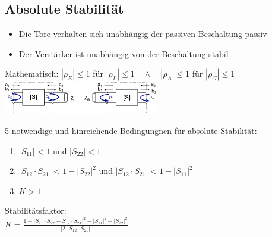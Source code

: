 \documentclass[english]{latex4ei/latex4ei_sheet}
\begin{document}
\begin{sectionbox}
	\subsection{Absolute Stabilität}
	\begin{itemize}
		\item Die Tore verhalten sich unabhängig der passiven Beschaltung passiv
		\item Der Verstärker ist unabhängig von der Beschaltung stabil
	\end{itemize}
	Mathematisch: $\left|\rho_{E}\right|\le1$ für $\left|\rho_{L}\right|\le1 \quad \wedge \quad\left|\rho_{A}\right|\le1$ für $\left|\rho_{G}\right|\le1$\\
	\includegraphics[width = 6.8cm]{./img/stablilitaet.png}\\
	\begin{emphbox}
		5 notwendige und hinreichende Bedingungnen für absolute Stabilität:\\
		\begin{enumerate}
			\item $\left|S_{11}\right|<1$ und $\left|S_{22}\right|<1$
			\item $\left|S_{12} \cdot S_{21}\right|<1-\left|S_{22}\right|^{2}$ und $\left|S_{12} \cdot S_{21}\right|<1-\left|S_{11}\right|^{2}$
			\item $K > 1$
		\end{enumerate}
		Stabilitätsfaktor:\\
		$K=\frac{1+\left|S_{11} \cdot S_{22}-S_{12} \cdot S_{21}\right|^{2}-\left|S_{11}\right|^{2}-\left|S_{22}\right|^{2}}{\left|2 \cdot S_{12} \cdot S_{21}\right|}$
	\end{emphbox}


\end{sectionbox}
\end{document}
